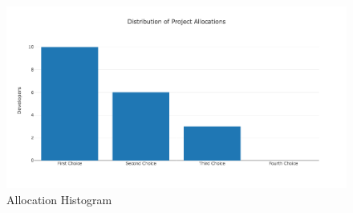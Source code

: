 \documentclass[11pt]{article}
\makeatletter
\def\maxwidth{\ifdim\Gin@nat@width>\linewidth\linewidth
    \else\Gin@nat@width\fi}
\let\Oldincludegraphics\includegraphics
\renewcommand{\includegraphics}[1]{\Oldincludegraphics[width=.9\maxwidth]{#1}}
\makeatother
\begin{document}
\begin{figure}[htbp]
\begin{center}
\includegraphics{Allocation.png}
\caption{Allocation Histogram}
\label{Histogram}
\end{center}
\end{figure}            

    
    
    
    
\end{document}

